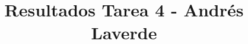 \documentclass{article}
\begin{document}
\title{Resultados Tarea 4 - Andrés Laverde}
\maketitle
\end{document}
